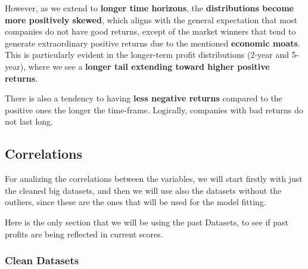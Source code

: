 \documentclass[11pt,english,a4paper,hidelinks]{book}
\begin{document}
\vspace{0.5cm}
\noindent However, as we extend to \textbf{longer time horizons}, the \textbf{distributions become more positively skewed}, which aligns with the general expectation that most companies do not have good returns, except of the market winners that tend to generate extraordinary positive returns due to the mentioned \textbf{economic moats}. This is particularly evident in the longer-term profit distributions (2-year and 5-year), where we see a \textbf{longer tail extending toward higher positive returns}.


\vspace{0.5cm}
\noindent There is also a tendency to having \textbf{less negative returns} compared to the positive ones the longer the time-frame. Logically, companies with bad returns do not last long.

\subsection{Correlations}

For analizing the correlations between the variables, we will start firstly with just the cleaned big datasets, and then we will use also the datasets without the outliers, since these are the ones that will be used for the model fitting.

\vspace{0.5cm}
\noindent Here is the only section that we will be using the past Datasets, to see if past profits are being reflected in current scores.
\subsubsection{Clean Datasets}
\end{document}
